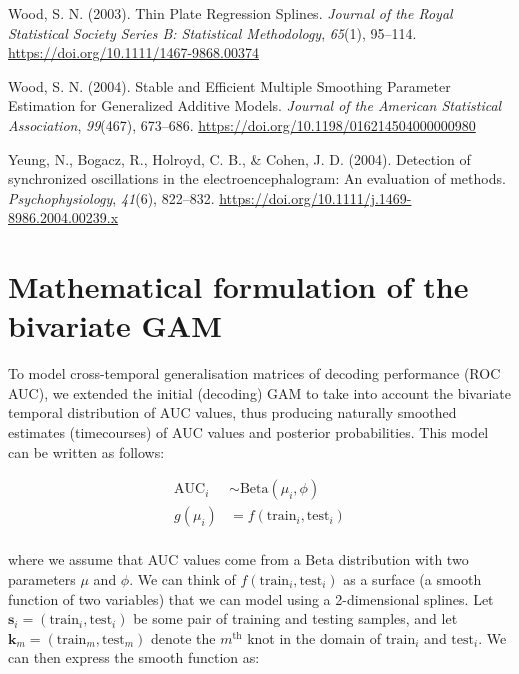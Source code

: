 \documentclass[
  doc,
  floatsintext,
  longtable,
  a4paper,
  nolmodern,
  notxfonts,
  notimes,
  colorlinks=true,linkcolor=blue,citecolor=blue,urlcolor=blue]{apa7}
\newlength{\cslhangindent}
\newenvironment{CSLReferences}[2] %
 {\begin{list}{}{%
  \setlength{\itemindent}{0pt}
  \setlength{\leftmargin}{0pt}
  \setlength{\parsep}{0pt}
  \ifodd #1
   \setlength{\leftmargin}{\cslhangindent}
   \setlength{\itemindent}{-1\cslhangindent}
  \fi
  \setlength{\itemsep}{#2\baselineskip}}}
 {\end{list}}
\begin{document}
\begin{CSLReferences}{1}{0}
Wood, S. N. (2003). Thin Plate Regression Splines. \emph{Journal of the
Royal Statistical Society Series B: Statistical Methodology},
\emph{65}(1), 95--114. \url{https://doi.org/10.1111/1467-9868.00374}

Wood, S. N. (2004). Stable and Efficient Multiple Smoothing Parameter
Estimation for Generalized Additive Models. \emph{Journal of the
American Statistical Association}, \emph{99}(467), 673--686.
\url{https://doi.org/10.1198/016214504000000980}

Yeung, N., Bogacz, R., Holroyd, C. B., \& Cohen, J. D. (2004). Detection
of synchronized oscillations in the electroencephalogram: An evaluation
of methods. \emph{Psychophysiology}, \emph{41}(6), 822--832.
\url{https://doi.org/10.1111/j.1469-8986.2004.00239.x}

\end{CSLReferences}

\newpage

\appendix

\section{Mathematical formulation of the bivariate
GAM}\label{mathematical-formulation-of-the-bivariate-gam}

To model cross-temporal generalisation matrices of decoding performance
(ROC AUC), we extended the initial (decoding) GAM to take into account
the bivariate temporal distribution of AUC values, thus producing
naturally smoothed estimates (timecourses) of AUC values and posterior
probabilities. This model can be written as follows:

\[
\begin{aligned}
\text{AUC}_{i} &\sim \mathrm{Beta}(\mu_{i}, \phi)\\
g(\mu_{i}) &= f \left(\text{train}_{i}, \text{test}_{i} \right)\\
\end{aligned}
\]

where we assume that AUC values come from a \(\mathrm{Beta}\)
distribution with two parameters \(\mu\) and \(\phi\). We can think of
\(f \left(\text{train}_{i}, \text{test}_{i} \right)\) as a surface (a
smooth function of two variables) that we can model using a
2-dimensional splines. Let
\(\mathbf{s}_{i} = \left(\text{train}_{i}, \text{test}_{i} \right)\) be
some pair of training and testing samples, and let
\(\mathbf{k}_{m} = \left(\text{train}_{m}, \text{test}_{m} \right)\)
denote the \(m^{\text{th}}\) knot in the domain of \(\text{train}_{i}\)
and \(\text{test}_{i}\). We can then express the smooth function as:
\end{document}
